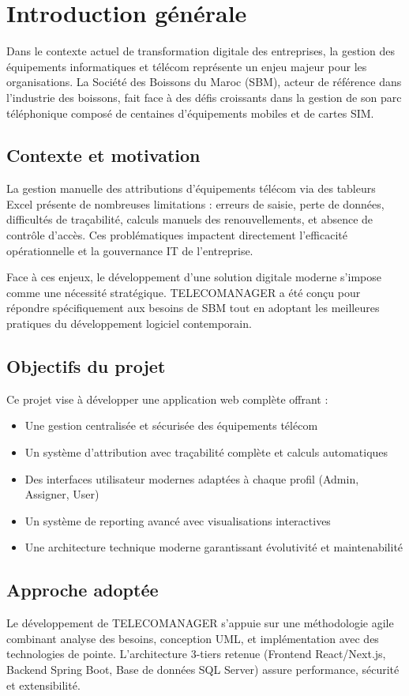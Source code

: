 \documentclass[12pt,a4paper]{report}
\begin{document}
\chapter{Introduction générale}
Dans le contexte actuel de transformation digitale des entreprises, la gestion des équipements informatiques et télécom représente un enjeu majeur pour les organisations. La Société des Boissons du Maroc (SBM), acteur de référence dans l'industrie des boissons, fait face à des défis croissants dans la gestion de son parc téléphonique composé de centaines d'équipements mobiles et de cartes SIM.

\section{Contexte et motivation}
La gestion manuelle des attributions d'équipements télécom via des tableurs Excel présente de nombreuses limitations : erreurs de saisie, perte de données, difficultés de traçabilité, calculs manuels des renouvellements, et absence de contrôle d'accès. Ces problématiques impactent directement l'efficacité opérationnelle et la gouvernance IT de l'entreprise.

Face à ces enjeux, le développement d'une solution digitale moderne s'impose comme une nécessité stratégique. TELECOMANAGER a été conçu pour répondre spécifiquement aux besoins de SBM tout en adoptant les meilleures pratiques du développement logiciel contemporain.

\section{Objectifs du projet}
Ce projet vise à développer une application web complète offrant :
\begin{itemize}
\item Une gestion centralisée et sécurisée des équipements télécom
\item Un système d'attribution avec traçabilité complète et calculs automatiques
\item Des interfaces utilisateur modernes adaptées à chaque profil (Admin, Assigner, User)
\item Un système de reporting avancé avec visualisations interactives
\item Une architecture technique moderne garantissant évolutivité et maintenabilité
\end{itemize}

\section{Approche adoptée}
Le développement de TELECOMANAGER s'appuie sur une méthodologie agile combinant analyse des besoins, conception UML, et implémentation avec des technologies de pointe. L'architecture 3-tiers retenue (Frontend React/Next.js, Backend Spring Boot, Base de données SQL Server) assure performance, sécurité et extensibilité.
\end{document}
